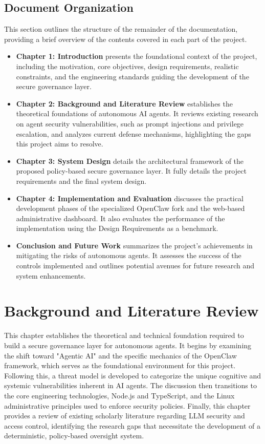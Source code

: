 \documentclass[a4paper]{report}
\begin{document}
\section{Document Organization}
\label{sec:doc_org}

This section outlines the structure of the remainder of the documentation, providing a brief overview of the contents covered in each part of the project.

\begin{itemize}
    \item \textbf{Chapter 1: Introduction} presents the foundational context of the project, including the motivation, core objectives, design requirements, realistic constraints, and the engineering standards guiding the development of the secure governance layer.

    \item \textbf{Chapter 2: Background and Literature Review} establishes the theoretical foundations of autonomous AI agents. It reviews existing research on agent security vulnerabilities, such as prompt injections and privilege escalation, and analyzes current defense mechanisms, highlighting the gaps this project aims to resolve.

    \item \textbf{Chapter 3: System Design} details the architectural framework of the proposed policy-based secure governance layer. It fully details the project requirements and the final system design.

    \item \textbf{Chapter 4: Implementation and Evaluation} discusses the practical development phases of the specialized OpenClaw fork and the web-based administrative dashboard. It also evaluates the performance of the implementation using the Design Requirements as a benchmark.

    \item \textbf{Conclusion and Future Work} summarizes the project's achievements in mitigating the risks of autonomous agents. It assesses the success of the controls implemented and outlines potential avenues for future research and system enhancements.
\end{itemize}

\chapter{Background and Literature Review}
This chapter establishes the theoretical and technical foundation required to build a secure governance layer for autonomous agents. It begins by examining the shift toward "Agentic AI" and the specific mechanics of the OpenClaw framework, which serves as the foundational environment for this project. Following this, a threat model is developed to categorize the unique cognitive and systemic vulnerabilities inherent in AI agents. The discussion then transitions to the core engineering technologies, Node.js and TypeScript, and the Linux administrative principles used to enforce security policies. Finally, this chapter provides a review of existing scholarly literature regarding LLM security and access control, identifying the research gaps that necessitate the development of a deterministic, policy-based oversight system.
\end{document}
